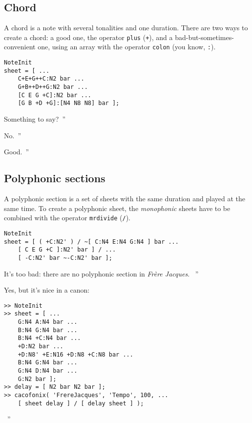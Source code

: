 \documentclass{article}
\newcommand{\frerejaques}{\emph{Fr\`ere Jacques}\xspace}
\newenvironment{meenv}{ \par \noindent \makebox[6em][r]{ \textcolor{mecolor}{Me}: `` --~}}{~''}
\newenvironment{myselfenv}{ \par \noindent \makebox[6em][r]{ \textcolor{myselfcolor}{Myself}: `` --~}}{~''}
\newcommand{\me}[1]{\begin{meenv}#1\end{meenv}}
\newcommand{\myself}[1]{\begin{myselfenv}#1\end{myselfenv}}
\begin{document}
\subsection{Chord}

A chord is a note with several tonalities and one duration. There are two ways to create a chord: a good one, the operator \lstinline!plus! (\lstinline!+!), and a bad-but-sometimes-convenient one, using an array with the operator \lstinline!colon! (you know, \lstinline!:!). \\

\begin{lstlisting}
NoteInit
sheet = [ ...
	C+E+G++C:N2 bar ...
	G+B++D++G:N2 bar ...
	[C E G +C]:N2 bar ...
	[G B +D +G]:[N4 N8 N8] bar ];
\end{lstlisting}

\myself{Something to say?}
\me{No.}
\myself{Good.}

\subsection{Polyphonic sections}
\label{sec:TutoPolyphonic}

A polyphonic section is a set of sheets with the same duration and played at the same time. To create a polyphonic sheet, the \emph{monophonic} sheets have to be combined with the operator \lstinline!mrdivide! (\lstinline!/!). \\
\begin{lstlisting}
NoteInit
sheet = [ ( +C:N2' ) / ~[ C:N4 E:N4 G:N4 ] bar ...
	[ C E G +C ]:N2' bar ] / ...
	[ -C:N2' bar ~-C:N2' bar ];
\end{lstlisting}

\begin{meenv}%
It's too bad: there are no polyphonic section in \frerejaques.%
\end{meenv}
\begin{myselfenv}%
Yes, but it's nice in a canon:

\begin{lstlisting}
>> NoteInit
>> sheet = [ ...
	G:N4 A:N4 bar ...
	B:N4 G:N4 bar ...
	B:N4 +C:N4 bar ...
	+D:N2 bar ...
	+D:N8' +E:N16 +D:N8 +C:N8 bar ...
	B:N4 G:N4 bar ...
	G:N4 D:N4 bar ...
	G:N2 bar ];
>> delay = [ N2 bar N2 bar ];
>> cacofonix( 'FrereJacques', 'Tempo', 100, ...
	[ sheet delay ] / [ delay sheet ] );
\end{lstlisting}%
\end{myselfenv}
\end{document}
